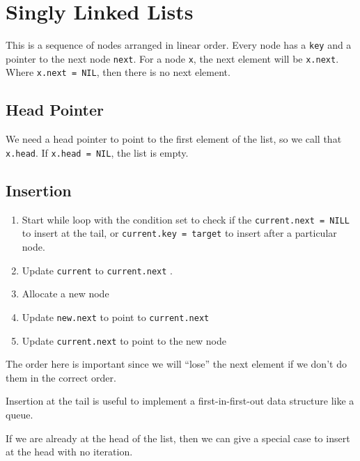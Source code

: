 \section{Singly Linked Lists}\label{sec:singly_linked_lists}

This is a sequence of nodes arranged in linear order.
Every node has a \texttt{key} and a pointer to the next node \texttt{next}.
For a node \texttt{x}, the next element will be \texttt{x.next}.
Where \texttt{x.next = NIL}, then there is no next element.

\subsection{Head Pointer}\label{sub:head_pointer}

We need a head pointer to point to the first element of the list, so we call that \texttt{x.head}.
If \texttt{x.head = NIL}, the list is empty.

\subsection{Insertion}\label{sub:insertiontolinkedlist}

\begin{enumerate}
    \item Start while loop with the condition set to check if the \texttt{current.next = NILL} to insert at the tail, or \texttt{current.key = target} to insert after a particular node.
    \item Update \texttt{current} to \texttt{current.next} .
    \item Allocate a new node
    \item Update \texttt{new.next} to point to \texttt{current.next}
    \item Update \texttt{current.next} to point to the new node
\end{enumerate}
\begin{note}
    The order here is important since we will ``lose'' the next element if we don't do them in the correct order.
\end{note}
\begin{note}
    Insertion at the tail is useful to implement a first-in-first-out data structure like a queue.
\end{note}
\begin{note}
    If we are already at the head of the list, then we can give a special case to insert at the head with no iteration.
\end{note}

